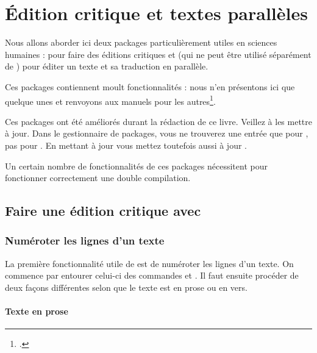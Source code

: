 \chapter{Édition critique et textes parallèles}  \label{ledmac}


\begin{intro}
Nous allons aborder ici deux packages particulièrement utiles en sciences humaines :  pour faire des éditions critiques et  (qui ne peut être utilisé séparément de ) pour éditer un texte et sa traduction en parallèle.

Ces packages contiennent moult fonctionnalités : nous n'en présentons ici que quelque unes et renvoyons aux manuels pour les autres\footcites{ledmac}{ledpar}. 
\end{intro}

\begin{attention}
Ces packages ont été améliorés durant la rédaction de ce livre. Veillez à les mettre à jour.
Dans le gestionnaire de packages, vous ne trouverez une entrée que pour  ,  pas pour .  En mettant à jour  vous mettez toutefois aussi à jour  .
\end{attention}

\begin{attention}
Un certain nombre de fonctionnalités de ces packages nécessitent pour fonctionner correctement une double compilation.
\end{attention}



\section{Faire une édition critique avec }

\subsection{Numéroter les lignes d'un texte}

La première fonctionnalité utile de  est de numéroter les lignes d'un texte. On commence par  entourer celui-ci des commandes  et . Il faut ensuite procéder de deux façons différentes  selon que le texte est en prose ou en vers.

\subsubsection{Texte en prose}


